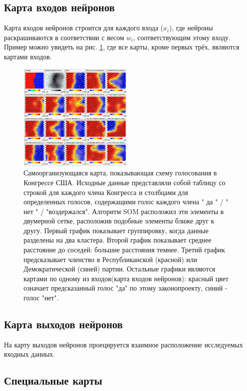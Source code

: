 \documentclass[a4paper,12pt]{article}
\begin{document}
\subsection{Карта входов нейронов}

Карта входов нейронов строится для каждого входа ($x_i$), где нейроны раскрашиваются в соответствии с весом $w_i$, соответствующим этому входу. Пример можно увидеть на рис. \ref{img:congress}, где все карты, кроме первых трёх, являются картами входов.

\begin{figure}[h]
  \centering
  \includegraphics[width=0.5\textwidth]{congress.png}
  \caption{Самоорганизующаяся карта, показывающая схему голосования в Конгрессе США. Исходные данные представляли собой таблицу со строкой для каждого члена Конгресса и столбцами для определенных голосов, содержащими голос каждого члена " да " / " нет " / "воздержался". Алгоритм SOM расположил эти элементы в двумерной сетке, расположив подобные элементы ближе друг к другу. Первый график показывает группировку, когда данные разделены на два кластера. Второй график показывает среднее расстояние до соседей: большие расстояния темнее. Третий график предсказывает членство в Республиканской (красной) или Демократической (синей) партии. Остальные графики являются картами по одному из входов(карта входов нейронов): красный цвет означает предсказанный голос "да" по этому законопроекту, синий - голос "нет".\cite{wikipedia_map_en}}
  \label{img:congress}
\end{figure}

\subsection{Карта выходов нейронов}

На карту выходов нейронов проецируется взаимное расположение исследуемых входных данных.

\subsection{Специальные карты}
\end{document}
